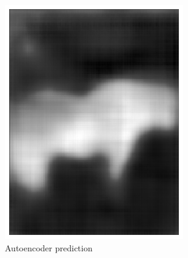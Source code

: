 \documentclass{l4proj}
\begin{document}
\begin{figure}[ht]
\begin{subfigure}[h!]{0.25\textwidth}
    \includegraphics[width=\textwidth]{images/autoencoder/pony_predicted.png}
    \caption{Autoencoder prediction}
  \end{subfigure}
  \begin{subfigure}[h!]{0.25\textwidth}

\end{subfigure}
\end{figure}
\end{document}
